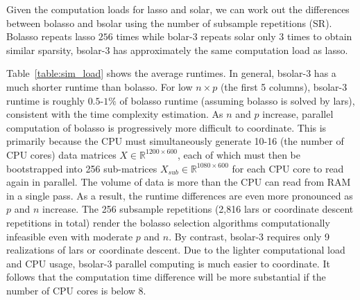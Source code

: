 \documentclass[11pt,review,authoryear]{elsarticle}
\begin{document}
Given the computation loads for lasso and solar, we can work out the differences between bolasso and bsolar using the number of subsample repetitions (SR). Bolasso repeats lasso $256$ times while bolar-3 repeats solar only 3 times to obtain similar sparsity, bsolar-3 has approximately the same computation load as lasso.

\begin{table}[ht]
%
\centering
%
\caption{Simulation results for parallel computation time (mean runtime in seconds).\label{table:sim_load}}
\smallskip
%
\end{table}

Table~\ref{table:sim_load} shows the average runtimes. In general, bsolar-3 has a much shorter runtime than bolasso. For low $n \times p$ (the first 5 columns), bsolar-3 runtime is roughly $0.5$-$1\%$ of bolasso runtime (assuming bolasso is solved by lars), consistent with the time complexity estimation. As $n$ and $p$ increase, parallel computation of bolasso is progressively more difficult to coordinate. This is primarily because the CPU must simultaneously generate 10-16 (the number of CPU cores) data matrices $X\in \mathbb{R}^{1200 \times 600}$, each of which must then be bootstrapped into 256 sub-matrices $X_{sub}\in \mathbb{R}^{1080 \times 600}$ for each CPU core to read again in parallel. The volume of data is more than the CPU can read from RAM in a single pass. As a result, the runtime differences are even more pronounced as $p$ and $n$ increase. The 256 subsample repetitions (2,816 lars or coordinate descent repetitions in total) render the bolasso selection algorithms computationally infeasible even with moderate $p$ and $n$. By contrast, bsolar-3 requires only 9 realizations of lars or coordinate descent. Due to the lighter computational load and CPU usage, bsolar-3 parallel computing is much easier to coordinate. It follows that the computation time difference will be more substantial if the number of CPU cores is below $8$.
\end{document}
